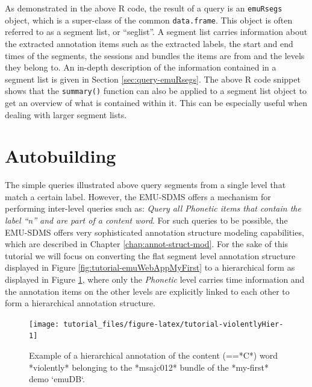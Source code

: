 \documentclass[]{book}
\begin{document}
As demonstrated in the above R code, the result of a query is an \texttt{emuRsegs} object, which is a super-class of the common \texttt{data.frame}. This object is often referred to as a segment list, or ``seglist''. A segment list carries information about the extracted annotation items such as the extracted labels, the start and end times of the segments, the sessions and bundles the items are from and the levels they belong to. An in-depth description of the information contained in a segment list is given in Section \ref{sec:query-emuRsegs}. The above R code snippet shows that the \texttt{summary()} function can also be applied to a segment list object to get an overview of what is contained within it. This can be especially useful when dealing with larger segment lists.

\hypertarget{autobuilding}{%
\section{Autobuilding}\label{autobuilding}}

The simple queries illustrated above query segments from a single level that match a certain label. However, the EMU-SDMS offers a mechanism for performing inter-level queries such as: \emph{Query all Phonetic items that contain the label ``n'' and are part of a content word}. For such queries to be possible, the EMU-SDMS offers very sophisticated annotation structure modeling capabilities, which are described in Chapter \ref{chap:annot-struct-mod}. For the sake of this tutorial we will focus on converting the flat segment level annotation structure displayed in Figure \ref{fig:tutorial-emuWebAppMyFirst} to a hierarchical form as displayed in Figure \ref{fig:tutorial-violentlyHier}, where only the \emph{Phonetic} level carries time information and the annotation items on the other levels are explicitly linked to each other to form a hierarchical annotation structure.

\begin{figure}

{\centering \texttt{[image: tutorial\_files/figure-latex/tutorial-violentlyHier-1]} 

}

\caption{Example of a hierarchical annotation of the content (==*C*) word *violently* belonging to the *msajc012* bundle of the *my-first* demo `emuDB`.}\label{fig:tutorial-violentlyHier}
\end{figure}
\end{document}
